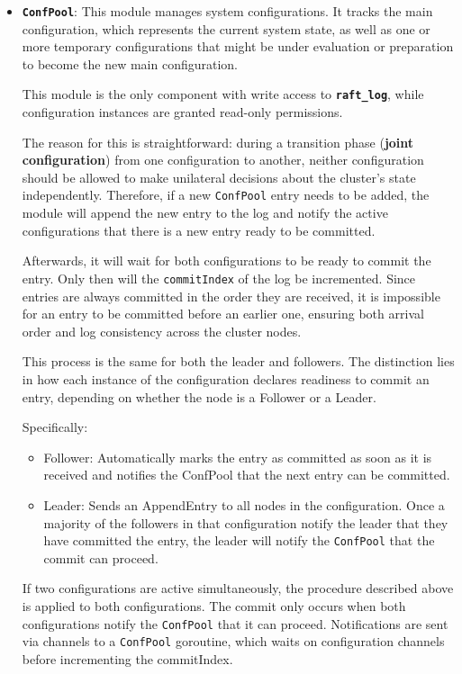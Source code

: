 \begin{itemize}
  \item \textbf{\texttt{ConfPool}}: This module manages system configurations. It tracks the main 
    configuration, which represents the current system state, as well as one or more temporary 
    configurations that might be under evaluation or preparation to become the new main configuration.
  
    This module is the only component with write access to \textbf{\texttt{raft\_log}}, while configuration 
    instances are granted read-only permissions.
  
    The reason for this is straightforward: during a transition phase (\textbf{joint configuration}) 
    from one configuration to another, neither configuration should be allowed to make 
    unilateral decisions about the cluster's state independently. Therefore, if a new \texttt{ConfPool}
    entry needs to be added, the module will append the new 
    entry to the log and notify the active configurations that there is a new entry ready to be committed.

    Afterwards, it will wait for both configurations to be ready to commit the entry. Only
    then will the \texttt{commitIndex} of the log be incremented. Since entries are always committed
    in the order they are received, it is impossible for an entry to be committed before an
    earlier one, ensuring both arrival order and log consistency across the cluster nodes.

    This process is the same for both the leader and followers. The distinction lies in how
    each instance of the configuration declares readiness to commit an entry, depending on
    whether the node is a Follower or a Leader.
    
    Specifically:
    \begin{itemize}
      \item Follower: Automatically marks the entry as committed as soon as it is received
        and notifies the ConfPool that the next entry can be committed.
      \item Leader: Sends an AppendEntry to all nodes in the configuration. Once a majority
        of the followers in that configuration notify the leader that they have committed 
        the entry, the leader will notify the \texttt{ConfPool} that the commit can proceed.
    \end{itemize}

    If two configurations are active simultaneously, the procedure described above is
    applied to both configurations. The commit only occurs when both configurations notify
    the \texttt{ConfPool} that it can proceed.
    Notifications are sent via channels to a \texttt{ConfPool} goroutine, which waits on configuration
    channels before incrementing the commitIndex.


\end{itemize}
